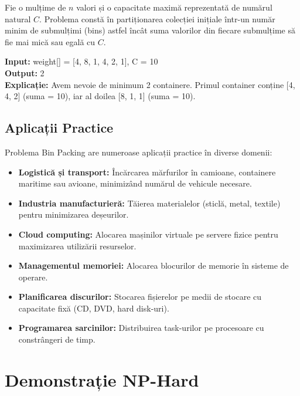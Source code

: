 \documentclass[runningheads]{llncs}
\begin{document}
Fie o mulțime de $n$ valori și o capacitate maximă reprezentată de numărul natural $C$. Problema constă în partiționarea colecției inițiale într-un număr minim de submulțimi (bins) astfel încât suma valorilor din fiecare submulțime să fie mai mică sau egală cu $C$.

\begin{tcolorbox}[BoxDarkBlue, title=\faIcon{list} Exemplu, fonttitle=\bfseries]
\textbf{Input:} weight[] = [4, 8, 1, 4, 2, 1], C = 10 \\
\textbf{Output:} 2 \\
\textbf{Explicație:} Avem nevoie de minimum 2 containere. Primul container conține [4, 4, 2] (suma = 10), iar al doilea [8, 1, 1] (suma = 10).
\end{tcolorbox}

\subsection{Aplicații Practice}

Problema Bin Packing are numeroase aplicații practice în diverse domenii:

\begin{itemize}
    \item \textbf{Logistică și transport:} Încărcarea mărfurilor în camioane, containere maritime sau avioane, minimizând numărul de vehicule necesare.
    \item \textbf{Industria manufacturieră:} Tăierea materialelor (sticlă, metal, textile) pentru minimizarea deșeurilor.
    \item \textbf{Cloud computing:} Alocarea mașinilor virtuale pe servere fizice pentru maximizarea utilizării resurselor.
    \item \textbf{Managementul memoriei:} Alocarea blocurilor de memorie în sisteme de operare.
    \item \textbf{Planificarea discurilor:} Stocarea fișierelor pe medii de stocare cu capacitate fixă (CD, DVD, hard disk-uri).
    \item \textbf{Programarea sarcinilor:} Distribuirea task-urilor pe procesoare cu constrângeri de timp.
\end{itemize}

\section{Demonstrație NP-Hard}
\end{document}
